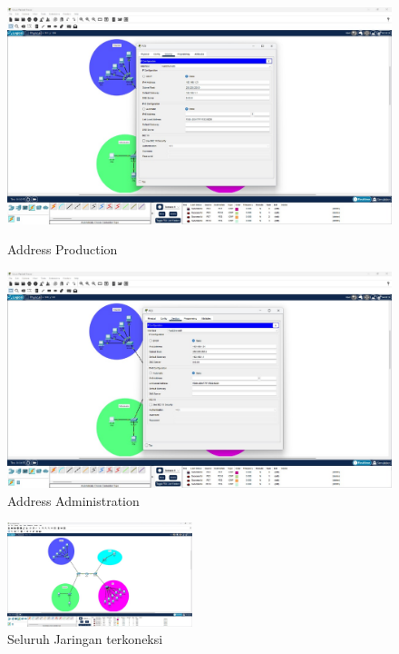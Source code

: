 \begin{figure}[H]
  \centering
  \begin{minipage}[t]{0.48\textwidth}
    \centering
    \includegraphics[width=\linewidth]{P1/img/ProdIP.jpeg}
    \caption{Address Production}
    \label{fig:production}
  \end{minipage}
  \hfill
  \begin{minipage}[t]{0.48\textwidth}
    \centering
    \includegraphics[width=\linewidth]{P1/img/AdminIP.jpeg}
    \caption{Address Administration}
    \label{fig:admin}
  \end{minipage}
\end{figure}

\begin{figure}[H]
  \centering
  \includegraphics[width=0.48\textwidth]{P1/img/Connected.jpeg}
  \caption{Seluruh Jaringan terkoneksi}
  \label{fig:connected}
\end{figure}

